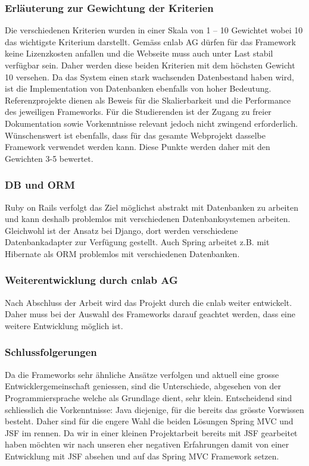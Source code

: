 \subsubsection{Erläuterung zur Gewichtung der Kriterien}
Die verschiedenen Kriterien wurden in einer Skala von 1 – 10 Gewichtet wobei 10 das wichtigste Kriterium darstellt. Gemäss cnlab AG dürfen für das Framework keine Lizenzkosten anfallen und die Webseite muss auch unter Last stabil verfügbar sein. Daher werden diese beiden Kriterien mit dem höchsten Gewicht 10 versehen.
Da das System einen stark wachsenden Datenbestand haben wird, ist die Implementation von Datenbanken ebenfalls von hoher Bedeutung. Referenzprojekte dienen als Beweis für die Skalierbarkeit und die Performance des jeweiligen Frameworks.
Für die Studierenden ist der Zugang zu freier Dokumentation sowie Vorkenntnisse relevant jedoch nicht zwingend erforderlich. Wünschenswert ist ebenfalls, dass für das gesamte Webprojekt dasselbe Framework verwendet werden kann. Diese Punkte werden daher mit den Gewichten 3-5 bewertet.
\subsubsection{DB und ORM}
Ruby on Rails verfolgt das Ziel möglichst abstrakt mit Datenbanken zu arbeiten und kann deshalb problemlos mit verschiedenen Datenbanksystemen arbeiten. Gleichwohl ist der Ansatz bei Django, dort werden verschiedene Datenbankadapter zur Verfügung gestellt. Auch Spring arbeitet z.B. mit Hibernate als ORM problemlos mit verschiedenen Datenbanken.
\subsubsection{Weiterentwicklung durch cnlab AG}
Nach Abschluss der Arbeit wird das Projekt durch die cnlab weiter entwickelt. Daher muss bei der Auswahl des Frameworks darauf geachtet werden, dass eine weitere Entwicklung möglich ist.
\subsubsection{Schlussfolgerungen}
Da die Frameworks sehr ähnliche Ansätze verfolgen und aktuell eine grosse Entwicklergemeinschaft geniessen, sind die Unterschiede, abgesehen von der Programmiersprache welche als Grundlage dient, sehr klein. Entscheidend sind schliesslich die Vorkenntnisse: Java diejenige, für die bereits das grösste Vorwissen besteht. Daher sind für die engere Wahl die beiden Lösungen Spring MVC und JSF im rennen. Da wir in einer kleinen Projektarbeit bereits mit JSF gearbeitet haben möchten wir nach unseren eher negativen  Erfahrungen damit von einer Entwicklung mit JSF absehen und auf das Spring MVC Framework setzen.